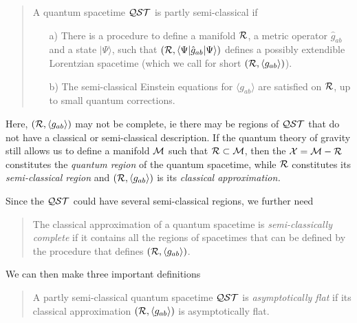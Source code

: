 \documentclass[12pt]{article}
\begin{document}
\begin{quotation}
A quantum spacetime ${\cal Q}{\cal S}{\cal T}$ is partly semi-classical if 
\begin{itemize}
\item[a)] There is a procedure to define a manifold ${\cal R}$, a metric operator $\hat{g}_{ab}$ and a state $|\Psi \rangle $, such that $({\cal R}, \langle \Psi | \hat{g}_{ab} | \Psi \rangle )$ defines 
a possibly extendible Lorentzian spacetime (which we call for short $({\cal R}, \langle g_{ab} \rangle )$).
\item[b)] The semi-classical Einstein equations for $\langle g_{ab} \rangle$ are satisfied on ${\cal R}$, up to small quantum  corrections.  

\end{itemize}  \end{quotation}

Here, $({\cal R}, \langle g_{ab} \rangle ) $ may not be complete, ie there may be regions of ${\cal Q}{\cal S}{\cal T}$ that do not have a classical or semi-classical description.  If the quantum theory of gravity still allows us to define a manifold ${\cal M}$ such that
${\cal R} \subset {\cal M} $, then the ${\cal X}= {\cal M} -{\cal R} $ constitutes the {\it quantum region} of the quantum spacetime, while ${\cal R}$ constitutes its {\it semi-classical region} and   $({\cal R}, \langle g_{ab} \rangle ) $ is its {\it classical approximation.}

Since the  ${\cal Q}{\cal S}{\cal T}$ could have several semi-classical regions, we further need

\begin{quotation}

The classical approximation of a quantum spacetime is {\it semi-classically complete} if it contains all the regions of spacetimes that can be defined by the procedure that defines $({\cal R}, \langle {g}_{ab} \rangle )$.   

\end{quotation}

We can then make three important definitions

\begin{quotation}

A partly semi-classical quantum spacetime ${\cal Q}{\cal S}{\cal T}$ is {\it asymptotically flat} if its classical approximation
$({\cal R}, \langle g_{ab} \rangle ) $ is asymptotically flat.  

\end{quotation}
\end{document}
